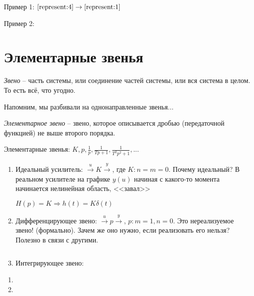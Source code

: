 \documentclass[main.tex]{subfiles}
\begin{document}
Пример 1: $ \ref{represent:4} \to \ref{represent:1} $ %

Пример 2:



\section{Элементарные звенья}

\emph{Звено} -- часть системы, или соединение частей системы, или вся система в целом.
То есть всё, что угодно.

Напомним, мы разбивали на однонаправленные звенья...

\emph{Элементарное звено} -- звено, которое описывается дробью (передаточной функцией) не выше второго порядка.

Элементарные звенья: $ K, p, \frac{1}{p}, \frac{1}{Tp+1}, \frac{1}{T^2p^2 + 1}, ... $

\begin{enumerate}[noitemsep]
	\item Идеальный усилитель: $ \xrightarrow{u} \boxed{K} \xrightarrow{y} $, где $ K: n=m=0 $.
	Почему идеальный? В реальном усилителе на графике $ y(u) $ начиная с какого-то момента начинается нелинейная область, <<завал>>
	
	$ H(p) = K \Rightarrow h(t) = K \delta(t) $
	
	\item Дифференцирующее звено: $ \xrightarrow{u} \boxed{p} \xrightarrow{y} $, $ p: m=1, n=0 $. Это нереализуемое звено! (формально). 
	Зачем же оно нужно, если реализовать его нельзя?
	Полезно в связи с другими.
	
	$  $ %
	
	\item Интегрирующее звено: 
\end{enumerate}

\begin{enumerate}[noitemsep]
	\item
	\item
\end{enumerate}
\end{document}
